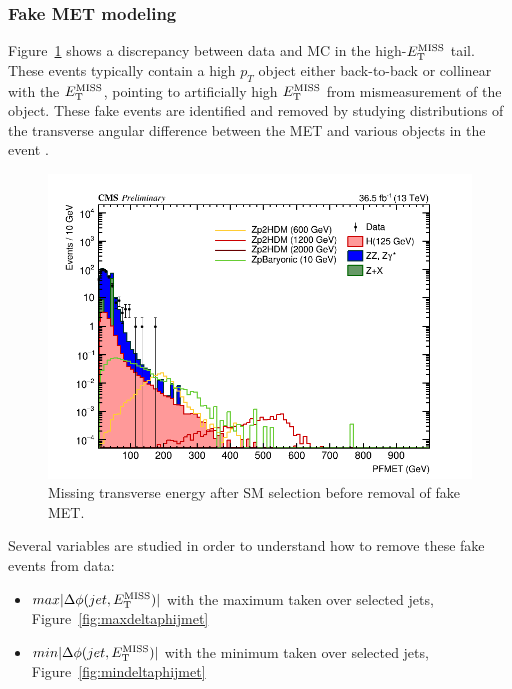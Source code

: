 \subsubsection{Fake MET modeling}\label{sec:fakemet}

Figure~\ref{fig:pfmet_m4lblinded} shows a discrepancy between data and MC in the high-$E_{\rm{T}}^{\rm{MISS}}$ tail. These events typically contain a high $p_T$ object either back-to-back or collinear with the $E_{\rm{T}}^{\rm{MISS}}$, pointing to artificially high $E_{\rm{T}}^{\rm{MISS}}$ from mismeasurement of the object. These fake events are identified and removed by studying distributions of the transverse angular difference between the MET and various objects in the event \cite{CMS-AN-15-203}.

\begin{figure}[tbh]
\centering
\includegraphics[width=5in]{figures/hist_hPFMET_8.png}
\caption{Missing transverse energy after SM selection before removal of fake MET.}
\label{fig:pfmet_m4lblinded}
\end{figure}

Several variables are studied in order to understand how to remove these fake events from data:

\begin{itemize}
  \item $max|\Delta\phi(jet, E_{\rm{T}}^{\rm{MISS}})|$ with the maximum taken over selected jets, Figure~\ref{fig:maxdeltaphijmet}
  \item $min|\Delta\phi(jet, E_{\rm{T}}^{\rm{MISS}})|$ with the minimum taken over selected jets, Figure~\ref{fig:mindeltaphijmet}
\end{itemize}

